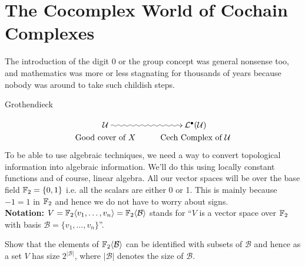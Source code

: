 
\section{The Cocomplex World of Cochain Complexes}
\epigraph{The introduction of the digit 0 or the group concept was general nonsense too, and mathematics was more or less stagnating for thousands of years because nobody was around to take such childish steps.}{Grothendieck}
\begin{align*}
 \xymatrix@R-2pc{
 \U \ar@{~>}[r] & \L^\bullet(\U)\\
 \mbox{Good cover of } X & \mbox{Cech Complex of } \U }
\end{align*}
To be able to use algebraic techniques, we need a way to convert topological information into algebraic information. We'll do this using locally constant functions and of course, linear algebra. All our vector spaces will be over the base field $ \mathbb{F}_2 = \{0, 1\}$ i.e. all the scalars are either 0 or 1. This is mainly because $-1 = 1$ in $ \mathbb{F}_2$
and hence we do not have to worry about signs.\\

\noindent \textbf{Notation:} $V = \mathbb{F}_2 \langle v_1, \dots, v_n \rangle = \mathbb{F}_2 \langle \mathcal{B} \rangle$ stands for ``$V$ is a vector space over $\mathbb{F}_2$ with basis $ \mathcal{B} = \{ v_1, \dots, v_n\}$''.
  \begin{ques}
      Show that the elements of $ \mathbb{F}_2 \langle \mathcal{B} \rangle$ can be identified with subsets of $\mathcal{B}$ and hence as a set $V$ has size $2^{\lvert\mathcal{B}\rvert}$, where $\lvert \mathcal{B} \rvert$ denotes the size of $\mathcal{B}$.
  \end{ques}

